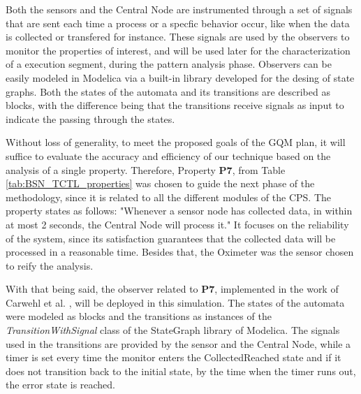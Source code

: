 Both the sensors and the Central Node are instrumented through a set of signals that are sent each time a process or a specfic behavior occur, like when the data is collected or transfered for instance. These signals are used by the observers to monitor the properties of interest, and will be used later for the characterization of a execution segment, during the pattern analysis phase. Observers can be easily modeled in Modelica via a built-in library developed for the desing of state graphs. Both the states of the automata and its transitions are described as blocks, with the difference being that the transitions receive signals as input to indicate the passing through the states. 

Without loss of generality, to meet the proposed goals of the GQM plan, it will suffice to evaluate the accuracy and efficiency of our technique based on the analysis of a single property. Therefore, Property \textbf{P7}, from Table \ref{tab:BSN_TCTL_properties} was chosen to guide the next phase of the methodology, since it is related to all the different modules of the CPS. The property states as follows: "Whenever a sensor node has collected data, in within at most 2 seconds, the Central Node will process it." It focuses on the reliability of the system, since its satisfaction guarantees that the collected data will be processed in a reasonable time. Besides that, the Oximeter was the sensor chosen to reify the analysis. 

With that being said, the observer related to \textbf{P7}, implemented in the work of Carwehl et al. \cite{2022PSP}, will be deployed in this simulation. The states of the automata were modeled as blocks and the transitions as instances of the \textit{TransitionWithSignal} class of the StateGraph library of Modelica. The signals used in the transitions are provided by the sensor and the Central Node, while a timer is set every time the monitor enters the CollectedReached state  and if it does not transition back to the initial state, by the time when the timer runs out, the error state is reached. 



